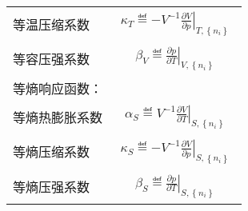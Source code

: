 \documentclass[main.tex]{subfiles}
\begin{document}
\begin{longtable}{m{}m{}}
  等温压缩系数                                       & \begin{align}\kappa_T\eqdef-V^{-1}\left.\frac{\partial V}{\partial p}\right|_{T,\left\{n_i\right\}}\end{align}                                                                                                                                                             \\[-4ex]
  等容压强系数                                       & \begin{align}\beta_V\eqdef\left.\frac{\partial p}{\partial T}\right|_{V,\left\{n_i\right\}}\end{align}                                                                                                                                                                     \\
  \multicolumn{2}{l}{{等熵响应函数：}}                                                                                                                                                                                                                                                                                             \\[-4ex]
  等熵热膨胀系数                                      & \begin{align}\alpha_S\eqdef V^{-1}\left.\frac{\partial V}{\partial T}\right|_{S,\left\{n_i\right\}}\end{align}                                                                                                                                                             \\[-4ex]
  等熵压缩系数                                       & \begin{align}\kappa_S\eqdef -V^{-1}\left.\frac{\partial V}{\partial p}\right|_{S,\left\{n_i\right\}}\end{align}                                                                                                                                                            \\[-4ex]
  等熵压强系数                                       & \begin{align}\beta_S\eqdef\left.\frac{\partial p}{\partial T}\right|_{S,\left\{n_i\right\}}\end{align}                                                                                                                                                                     \\

\end{longtable}
\end{document}
